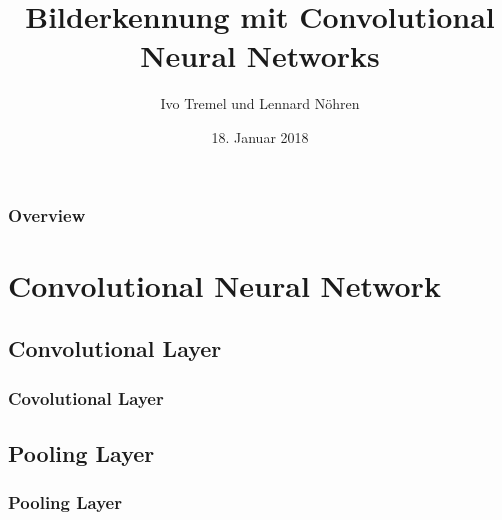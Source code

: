 \documentclass{beamer}
\title[Convolutional Neural Networks]{Bilderkennung mit Convolutional Neural Networks} %
\author{Ivo Tremel und Lennard N\"{o}hren} %
\institute[CHI] %
{
Leibniz Universit\"{a}t Hannover \\ %
\medskip
}
\date{18. Januar 2018} %
\begin{document}
\begin{frame}
\titlepage %
\end{frame}

\begin{frame}
\frametitle{Overview} %
\tableofcontents %
\end{frame}


\section{Convolutional Neural Network} %

\subsection{Convolutional Layer} %

\begin{frame}
	\frametitle{Covolutional Layer}
\end{frame}


\subsection{Pooling Layer}

\begin{frame}
	\frametitle{Pooling Layer}
\end{frame}
\end{document}
